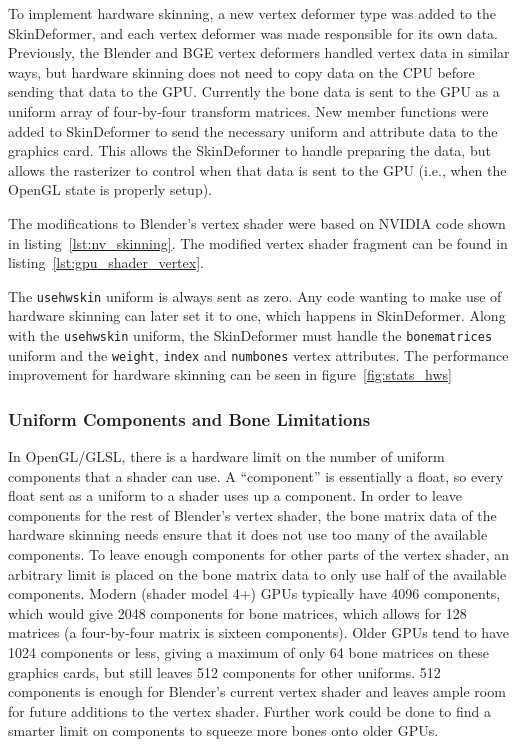 \label{sec:hardware_skinning}

To implement hardware skinning, a new vertex deformer type was added to the SkinDeformer, and each vertex deformer was made responsible for its own data.
Previously, the Blender and BGE vertex deformers handled vertex data in similar ways, but hardware skinning does not need to copy data on the CPU before sending that data to the GPU.
Currently the bone data is sent to the GPU as a uniform array of four-by-four transform matrices.
New member functions were added to SkinDeformer to send the necessary uniform and attribute data to the graphics card.
This allows the SkinDeformer to handle preparing the data, but allows the rasterizer to control when that data is sent to the GPU (i.e., when the OpenGL state is properly setup).

The modifications to Blender's vertex shader were based on NVIDIA code shown in listing~\ref{lst:nv_skinning}.
The modified vertex shader fragment can be found in listing~\ref{lst:gpu_shader_vertex}.


The \texttt{usehwskin} uniform is always sent as zero.
Any code wanting to make use of hardware skinning can later set it to one, which happens in SkinDeformer.
Along with the \texttt{usehwskin} uniform, the SkinDeformer must handle the \texttt{bonematrices} uniform and the \texttt{weight}, \texttt{index} and \texttt{numbones} vertex attributes.
The performance improvement for hardware skinning can be seen in figure~\ref{fig:stats_hws}


\subsubsection{Uniform Components and Bone Limitations}

In OpenGL/GLSL, there is a hardware limit on the number of uniform components that a shader can use.
A ``component'' is essentially a float, so every float sent as a uniform to a shader uses up a component.
In order to leave components for the rest of Blender's vertex shader, the bone matrix data of the hardware skinning needs ensure that it does not use too many of the available components.
To leave enough components for other parts of the vertex shader, an arbitrary limit is placed on the bone matrix data to only use half of the available components.
Modern (shader model 4+) GPUs typically have 4096 components, which would give 2048 components for bone matrices, which allows for 128 matrices (a four-by-four matrix is sixteen components).
Older GPUs tend to have 1024 components or less, giving a maximum of only 64 bone matrices on these graphics cards, but still leaves 512 components for other uniforms.
512 components is enough for Blender's current vertex shader and leaves ample room for future additions to the vertex shader.
Further work could be done to find a smarter limit on components to squeeze more bones onto older GPUs.

